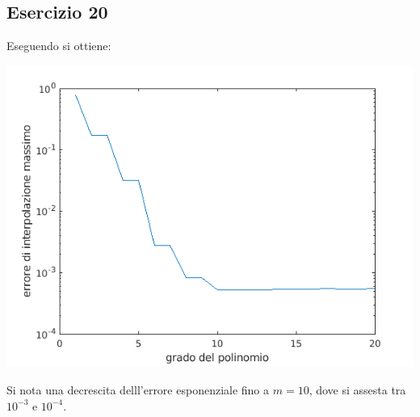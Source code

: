 \subsection{Esercizio 20}

Eseguendo  si ottiene:

\includegraphics[scale=0.8]{capitolo4/squares.png}


Si nota una decrescita  delll'errore  esponenziale fino a  $m = 10$, dove si assesta tra $10^{-3}$ e $10^{-4}$.